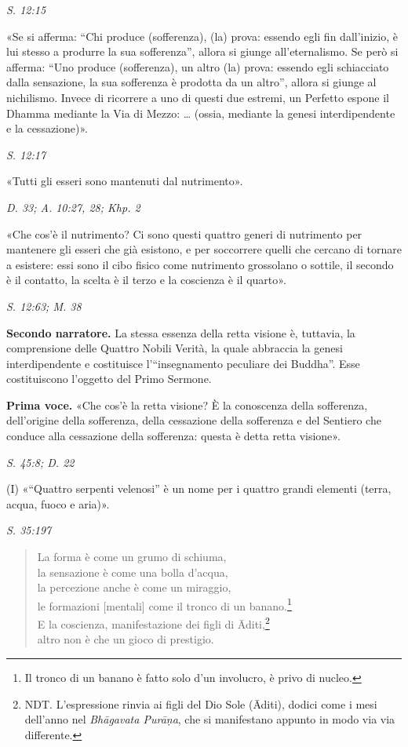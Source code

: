 \emph{S. 12:15}


«Se si afferma: “Chi produce (sofferenza), (la) prova: essendo egli fin
dall’inizio, è lui stesso a produrre la sua sofferenza”, allora si
giunge all’eternalismo. Se però si afferma: “Uno produce (sofferenza),
un altro (la) prova: essendo egli schiacciato dalla sensazione, la sua
sofferenza è prodotta da un altro”, allora si giunge al nichilismo.
Invece di ricorrere a uno di questi due estremi, un Perfetto espone il
Dhamma mediante la Via di Mezzo: … (ossia, mediante la genesi
interdipendente e la cessazione)».


\emph{S. 12:17}


«Tutti gli esseri sono mantenuti dal nutrimento».


\emph{D. 33; A. 10:27, 28; Khp. 2}


«Che cos’è il nutrimento? Ci sono questi quattro generi di nutrimento
per mantenere gli esseri che già esistono, e per soccorrere quelli che
cercano di tornare a esistere: essi sono il cibo fisico come nutrimento
grossolano o sottile, il secondo è il contatto, la scelta è il terzo e
la coscienza è il quarto».


\emph{S. 12:63; M. 38}


\textbf{Secondo narratore.} La stessa essenza della retta visione è, tuttavia, la
comprensione delle Quattro Nobili Verità, la quale abbraccia la genesi
interdipendente e costituisce l’“insegnamento peculiare dei Buddha”.
Esse costituiscono l’oggetto del Primo Sermone.


\textbf{Prima voce.} «Che cos’è la retta visione? È la conoscenza della
sofferenza, dell’origine della sofferenza, della cessazione della
sofferenza e del Sentiero che conduce alla cessazione della sofferenza:
questa è detta retta visione».


\emph{S. 45:8; D. 22}


(I) «“Quattro serpenti velenosi” è un nome per i quattro grandi
elementi (terra, acqua, fuoco e aria)».


\emph{S. 35:197}


\begin{quotation}
La forma è come un grumo di schiuma, \\
la sensazione è come una bolla d’acqua, \\
la percezione anche è come un miraggio, \\
le formazioni [mentali] come il tronco di un banano.\footnote{Il tronco di un banano è fatto solo d’un involucro, è privo di nucleo.} \\
E la coscienza, manifestazione dei figli di Āditi,\footnote{NDT. L’espressione rinvia ai figli del Dio Sole (Āditi), dodici come i mesi dell’anno nel \emph{Bhāgavata Purāṇa}, che si manifestano appunto in modo via via differente.} \\
altro non è che un gioco di prestigio.
\end{quotation}

